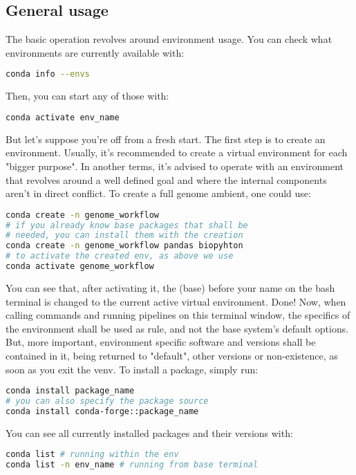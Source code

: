 \documentclass[a4paper,11pt]{article}
\begin{document}
\subsection{General usage}
The basic operation revolves around environment usage. You can check what
environments are currently available with:
\begin{lstlisting}[language=bash]
conda info --envs
\end{lstlisting}
Then, you can start any of those with:
\begin{lstlisting}[language=bash]
conda activate env_name
\end{lstlisting}
But let's suppose you're off from a fresh start. The first step is to create an
environment. Usually, it's recommended to create a virtual environment for each
"bigger purpose". In another terms, it's advised to operate with an environment
that revolves around a well defined goal and where the internal components
aren't in direct conflict. To create a full genome ambient, one could use:
\begin{lstlisting}[language=bash]
conda create -n genome_workflow
# if you already know base packages that shall be
# needed, you can install them with the creation
conda create -n genome_workflow pandas biopyhton
# to activate the created env, as above we use
conda activate genome_workflow
\end{lstlisting}
You can see that, after activating it, the (base) before your name on the bash
terminal is changed to the current active virtual environment. Done! Now, when
calling commands and running pipelines on this terminal window, the specifics of
the environment shall be used as rule, and not the base system's default
options. But, more important, environment specific software and versions shall
be contained in it, being returned to "default", other versions or
non-existence, as soon as you exit the venv. To install a package, simply run:
\begin{lstlisting}[language=bash]
conda install package_name
# you can also specify the package source
conda install conda-forge::package_name 
\end{lstlisting}
\begin{tipbox}
You can see all currently installed packages and their versions with:
\begin{lstlisting}[language=bash]
conda list # running within the env
conda list -n env_name # running from base terminal
\end{lstlisting}
\end{tipbox}
\end{document}
